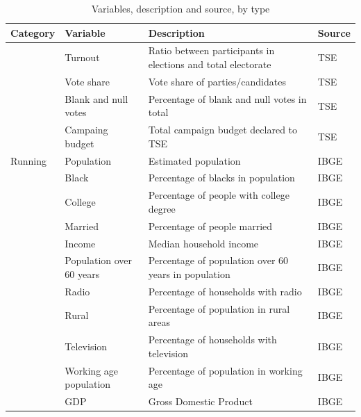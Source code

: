 \documentclass[
  12pt,
]{article}
\begin{document}
\begin{table}[!h]

\caption{\label{tab:variables}Variables, description and source, by type}
\centering
\fontsize{9}{11}\selectfont
\begin{tabu} to 
\toprule
Category & Variable & Description & Source\\
\midrule
 & Turnout & Ratio between participants in elections and total electorate & TSE\\

 & Vote share & Vote share of parties/candidates & TSE\\

 & Blank and null votes & Percentage of blank and null votes in total & TSE\\

 & Campaing budget & Total campaign budget declared to TSE & TSE\\
Running & Population & Estimated population & IBGE\\
 & Black & Percentage of blacks in population & IBGE\\

 & College & Percentage of people with college degree & IBGE\\

 & Married & Percentage of people married & IBGE\\

 & Income & Median household income & IBGE\\

 & Population over 60 years & Percentage of population over 60 years in population & IBGE\\

 & Radio & Percentage of households with radio & IBGE\\

 & Rural & Percentage of population in rural areas & IBGE\\

 & Television & Percentage of households with television & IBGE\\

 & Working age population & Percentage of population in working age & IBGE\\

 & GDP & Gross Domestic Product & IBGE\\


\end{tabu}
\end{table}
\end{document}
